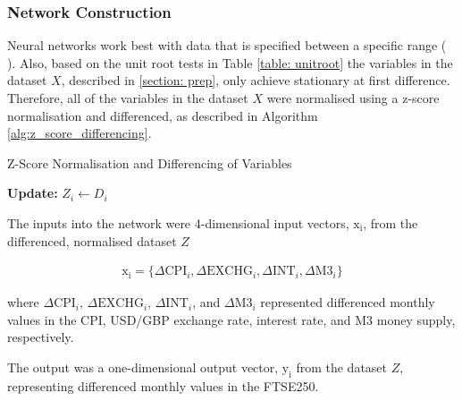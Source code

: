 \documentclass[11pt,a4paper]{article}
\newcommand{\citeboth}[1]{\citeauthor{#1} \citep{#1}}
\begin{document}
\subsubsection{Network Construction}

Neural networks work best with data that is specified between a specific 
range (\citeboth{mendelsohn1993}).
Also, based on the unit root tests in Table \ref{table: unitroot} the variables in the dataset $X$, described in \ref{section: prep},
only achieve stationary at first difference.
Therefore, all of the 
variables in the dataset $X$ were normalised using a z-score normalisation and differenced,
as described in Algorithm \ref{alg:z_score_differencing}. 

\begin{algorithm}[H]
    \caption{Z-Score Normalisation and Differencing of Variables}
    \label{alg:z_score_differencing}
    
    \textbf{Update:} $Z_i \leftarrow D_i$ \;
\end{algorithm}

The inputs into the network were 4-dimensional input vectors, \(\boldsymbol{\mathrm{x_i}}\), from the differenced, normalised dataset $Z$

\begin{align}
    \boldsymbol{\mathrm{x_i}} = \{\Delta \text{CPI}_i, \Delta \text{EXCHG}_i, \Delta \text{INT}_i, \Delta \text{M3}_i\}
\end{align}

where \(\Delta \text{CPI}_i\), \(\Delta \text{EXCHG}_i\), \(\Delta \text{INT}_i\), and \(\Delta \text{M3}_i\) 
represented differenced monthly values in the CPI, USD/GBP exchange rate, interest rate, and M3 money supply, respectively. 

The output was a one-dimensional output vector, \(\boldsymbol{\mathrm{y_i}}\) from the dataset $Z$, representing differenced monthly values in the FTSE250.
\end{document}
